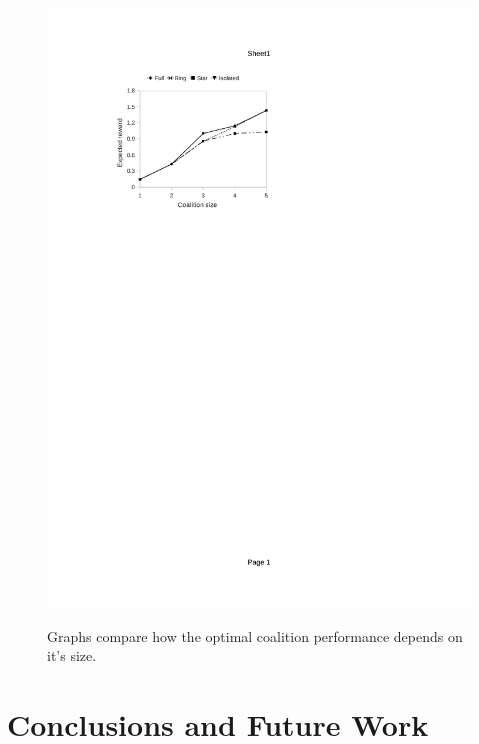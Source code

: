 \documentclass{llncs}
\begin{document}
\begin{figure}[H]
{\includegraphics[clip=true, trim=63 550 280 80, scale=0.77]{images/w2_stpg_online}
}
\caption{Graphs compare how the optimal coalition performance depends on it's size.}
\label{fig:coalition_performance}
\end{figure}









\clearpage

\section{Conclusions and Future Work}
\end{document}
